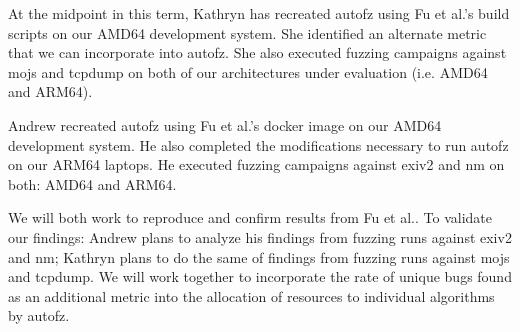 At the midpoint in this term, Kathryn has recreated autofz using Fu et al.\cite{Fu}'s build scripts
on our AMD64 development system. She identified an alternate metric that we can incorporate into
autofz. She also executed fuzzing campaigns against mojs and tcpdump on both of our architectures
under evaluation (i.e. AMD64 and ARM64).

Andrew recreated autofz using Fu et al.\cite{Fu}'s docker image on our AMD64 development system.
He also completed the modifications necessary to run autofz on our ARM64 laptops. He executed fuzzing
campaigns against exiv2 and nm on both: AMD64 and ARM64.

We will both work to reproduce and confirm results from Fu et al.\cite{Fu}. To validate our findings:
Andrew plans to analyze his findings from fuzzing runs against exiv2 and nm; Kathryn plans to do the
same of findings from fuzzing runs against mojs and tcpdump. We will work together to incorporate
the rate of unique bugs found as an additional metric into the allocation of resources to individual
algorithms by autofz.









